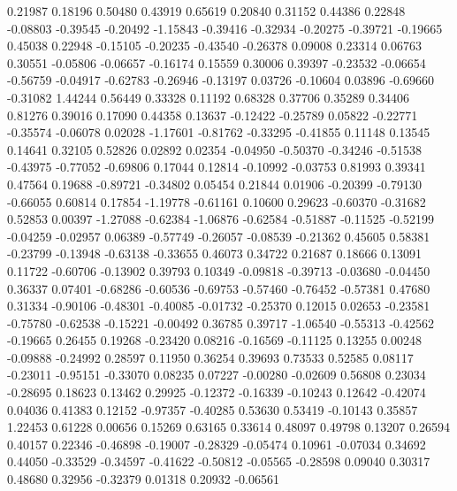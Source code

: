    0.21987  0.18196
   0.50480  0.43919
   0.65619  0.20840
   0.31152  0.44386
   0.22848 -0.08803
  -0.39545 -0.20492
  -1.15843 -0.39416
  -0.32934 -0.20275
  -0.39721 -0.19665
   0.45038  0.22948
  -0.15105 -0.20235
  -0.43540 -0.26378
   0.09008  0.23314
   0.06763  0.30551
  -0.05806 -0.06657
  -0.16174  0.15559
   0.30006  0.39397
  -0.23532 -0.06654
  -0.56759 -0.04917
  -0.62783 -0.26946
  -0.13197  0.03726
  -0.10604  0.03896
  -0.69660 -0.31082
   1.44244  0.56449
   0.33328  0.11192
   0.68328  0.37706
   0.35289  0.34406
   0.81276  0.39016
   0.17090  0.44358
   0.13637 -0.12422
  -0.25789  0.05822
  -0.22771 -0.35574
  -0.06078  0.02028
  -1.17601 -0.81762
  -0.33295 -0.41855
   0.11148  0.13545
   0.14641  0.32105
   0.52826  0.02892
   0.02354 -0.04950
  -0.50370 -0.34246
  -0.51538 -0.43975
  -0.77052 -0.69806
   0.17044  0.12814
  -0.10992 -0.03753
   0.81993  0.39341
   0.47564  0.19688
  -0.89721 -0.34802
   0.05454  0.21844
   0.01906 -0.20399
  -0.79130 -0.66055
   0.60814  0.17854
  -1.19778 -0.61161
   0.10600  0.29623
  -0.60370 -0.31682
   0.52853  0.00397
  -1.27088 -0.62384
  -1.06876 -0.62584
  -0.51887 -0.11525
  -0.52199 -0.04259
  -0.02957  0.06389
  -0.57749 -0.26057
  -0.08539 -0.21362
   0.45605  0.58381
  -0.23799 -0.13948
  -0.63138 -0.33655
   0.46073  0.34722
   0.21687  0.18666
   0.13091  0.11722
  -0.60706 -0.13902
   0.39793  0.10349
  -0.09818 -0.39713
  -0.03680 -0.04450
   0.36337  0.07401
  -0.68286 -0.60536
  -0.69753 -0.57460
  -0.76452 -0.57381
   0.47680  0.31334
  -0.90106 -0.48301
  -0.40085 -0.01732
  -0.25370  0.12015
   0.02653 -0.23581
  -0.75780 -0.62538
  -0.15221 -0.00492
   0.36785  0.39717
  -1.06540 -0.55313
  -0.42562 -0.19665
   0.26455  0.19268
  -0.23420  0.08216
  -0.16569 -0.11125
   0.13255  0.00248
  -0.09888 -0.24992
   0.28597  0.11950
   0.36254  0.39693
   0.73533  0.52585
   0.08117 -0.23011
  -0.95151 -0.33070
   0.08235  0.07227
  -0.00280 -0.02609
   0.56808  0.23034
  -0.28695  0.18623
   0.13462  0.29925
  -0.12372 -0.16339
  -0.10243  0.12642
  -0.42074  0.04036
   0.41383  0.12152
  -0.97357 -0.40285
   0.53630  0.53419
  -0.10143  0.35857
   1.22453  0.61228
   0.00656  0.15269
   0.63165  0.33614
   0.48097  0.49798
   0.13207  0.26594
   0.40157  0.22346
  -0.46898 -0.19007
  -0.28329 -0.05474
   0.10961 -0.07034
   0.34692  0.44050
  -0.33529 -0.34597
  -0.41622 -0.50812
  -0.05565 -0.28598
   0.09040  0.30317
   0.48680  0.32956
  -0.32379  0.01318
   0.20932 -0.06561
